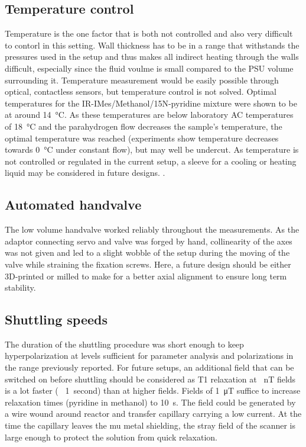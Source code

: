         \subsection{Temperature control}
        \label{cd:sabreShuttling:tempControl}
            Temperature is the one factor that is both not controlled and also very difficult to contorl in this setting. Wall thickness has to be in a range that withstands the pressures used in the setup and thus makes all indirect heating through the walls difficult, especially since the fluid voulme is small compared to the PSU volume surrounding it. Temperature measurement would be easily possible through optical, contactless sensors, but temperature control is not solved. Optimal temperatures for the IR-IMes/Methanol/15N-pyridine mixture were shown to be at around \SI{14}{\celsius}. As these temperatures are below laboratory AC temperatures of \SI{18}{\celsius} and the parahydrogen flow decreases the sample's temperature, the optimal temperature was reached (experiments show temperature decreases towards \SI{0}{\celsius} under constant flow), but may well be undercut. As temperature is not controlled or regulated in the current setup, a sleeve for a cooling or heating liquid may be considered in future designs. .
        \subsection{Automated handvalve}
            The low volume handvalve worked reliably throughout the measurements. As the adaptor connecting servo and valve was forged by hand, collinearity of the axes was not given and led to a slight wobble of the setup during the moving of the valve while straining the fixation screws. Here, a future design should be either 3D-printed or milled to make for a better axial alignment to ensure long term stability. 
        \subsection{Shuttling speeds}
            The duration of the shuttling procedure was short enough to keep hyperpolarization at levels sufficient for parameter analysis and polarizations in the range previously reported. For future setups, an additional field that can be switched on before shuttling should be considered as T1 relaxation at \SI{}{\nano\tesla} fields is a lot faster (~ \SI{1}{second}) than at higher fields. Fields of \SI{1}{\micro\tesla} suffice to increase relaxation times (pyridine in methanol) to  \SI{10}{\second}. The field could be generated by a wire wound around reactor and transfer capillary carrying a low current. At the time the capillary leaves the mu metal shielding, the stray field of the scanner is large enough to protect the solution from quick relaxation.
